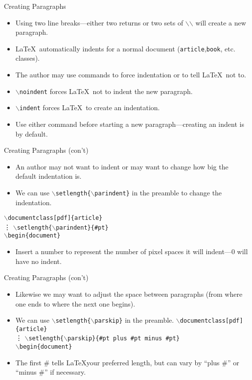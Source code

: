 \documentclass[pdf]{prosper}
\begin{document}
\begin{slide}{Creating Paragraphs}
	\begin{itemize}
		\item Using two line breaks---either two returns or two sets of $\backslash$$\backslash$ will create a new paragraph.
		\item \LaTeX\ automatically indents for a normal document (\texttt{article},\texttt{book}, etc. classes).
		\item The author may use commands to force indentation or to tell \LaTeX\ not to.
		\item \texttt{$\backslash$noindent} forces \LaTeX\ not to indent the new paragraph.
		\item \texttt{$\backslash$indent} forces \LaTeX\ to create an indentation.
		\item Use either command before starting a new paragraph---creating an indent is by default.
	\end{itemize}
\end{slide}
\begin{slide}{Creating Paragraphs (con't)}
	\begin{itemize}
		\item An author may not want to indent or may want to change how big the default indentation is.
		\item We can use \texttt{$\backslash$setlength\{$\backslash$parindent\}} in the preamble to change the indentation.
	\end{itemize}
			\texttt{$\backslash$documentclass[pdf]\{article\}} \\
			\vdots
			\texttt{$\backslash$setlength\{$\backslash$parindent\}\{\#pt\}} \\
			\texttt{$\backslash$begin\{document\}} \\
	\begin{itemize}
		\item Insert a number to represent the number of pixel spaces it will indent---0 will have no indent.
	\end{itemize}
\end{slide}
\begin{slide}{Creating Paragraphs (con't)}
	\begin{itemize}
		\item Likewise we may want to adjust the space between paragraphs (from where one ends to where the next one begins).
		\item We can use \texttt{$\backslash$setlength\{$\backslash$parskip\}} in the preamble.
			\texttt{$\backslash$documentclass[pdf]\{article\}} \\
			\vdots
			\texttt{$\backslash$setlength\{$\backslash$parskip\}\{\#pt plus \#pt minus \#pt\}} \\
			\texttt{$\backslash$begin\{document\}} \\
		\item The first \# tells \LaTeX your preferred length, but can vary by ``plus \#'' or ``minus \#'' if necessary.
	\end{itemize}
\end{slide}
\end{document}

